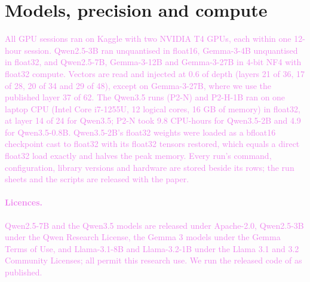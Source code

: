 \documentclass[11pt,a4paper]{article}
\newcommand{\draft}[1]{\textcolor{violet}{#1}}
\begin{document}
\section{Models, precision and compute}
\label{app:compute}
\draft{All GPU sessions ran on Kaggle with two NVIDIA T4 GPUs, each within one 12-hour session.
Qwen2.5-3B ran unquantised in float16, Gemma-3-4B unquantised in float32, and Qwen2.5-7B,
Gemma-3-12B and Gemma-3-27B in 4-bit NF4 with float32 compute. Vectors are read and injected at 0.6
of depth (layers 21 of 36, 17 of 28, 20 of 34 and 29 of 48), except on Gemma-3-27B, where we use the
published layer 37 of 62. The Qwen3.5 runs (P2-N) and P2-H-1B ran on one laptop CPU (Intel Core
i7-1255U, 12 logical cores, 16 GB of memory) in float32, at layer 14 of 24 for Qwen3.5; P2-N took
9.8 CPU-hours for Qwen3.5-2B and 4.9 for Qwen3.5-0.8B. Qwen3.5-2B's float32 weights were loaded as a
bfloat16 checkpoint cast to float32 with its float32 tensors restored, which equals a direct float32
load exactly and halves the peak memory. Every run's command, configuration, library versions and
hardware are stored beside its rows; the run sheets and the scripts are released with the paper.}

\draft{\paragraph{Licences.} Qwen2.5-7B and the Qwen3.5 models are released under Apache-2.0, Qwen2.5-3B
under the Qwen Research License, the Gemma 3 models under the Gemma Terms of Use, and Llama-3.1-8B
and Llama-3.2-1B under the Llama 3.1 and 3.2 Community Licenses; all permit this research use.
We run the released code of \citet{macar2026mechanisms} as published.}
\end{document}
